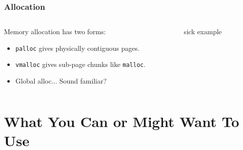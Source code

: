 \documentclass{beamer}
\begin{document}
\begin{frame}[fragile]
  \frametitle{Allocation}
  \begin{columns}
    \begin{column}{0.5\textwidth}
      Memory allocation has two forms:
      \begin{itemize}
      \item \verb_palloc_ gives physically contiguous pages.\\
      \item \verb_vmalloc_ gives sub-page chunks like \verb_malloc_.\\
      \item Global alloc... Sound familiar?
      \end{itemize}
    \end{column}
    \begin{column}{0.5\textwidth}
      sick example
    \end{column}
  \end{columns}
\end{frame}

\section{What You Can or Might Want To Use}
\end{document}
